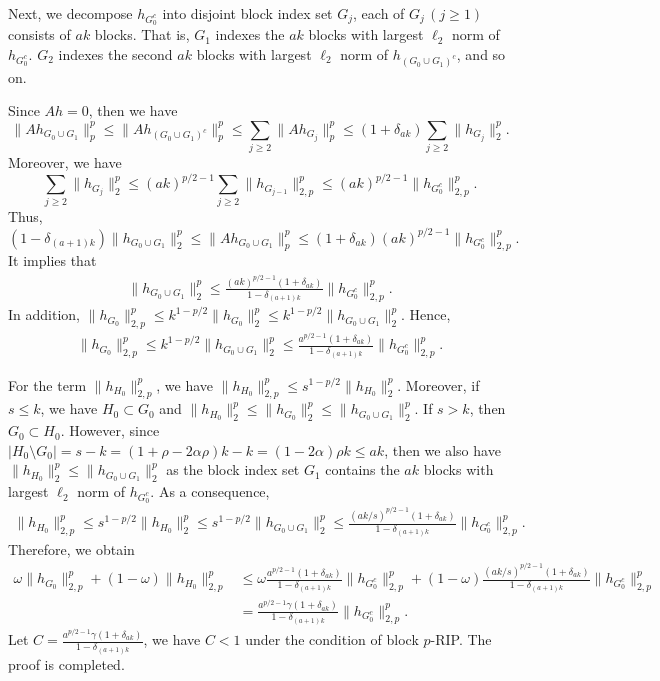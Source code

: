 \documentclass[11pt]{article}
\begin{document}
Next, we decompose $h_{G_0^c}$ into disjoint block index set $G_j$, each of $G_{j}\,(j\geq 1)$ consists of $ak$ blocks. That is, $G_1$ indexes the $ak$ blocks with largest $\ell_2$ norm of $h_{G_0^c}$. $G_2$ indexes the second $ak$ blocks with largest $\ell_2$ norm of $h_{(G_0\cup G_1)^c}$, and so on.

Since $Ah=0$, then we have $$
\lVert A h_{G_0\cup G_1}\rVert_p^p\leq \lVert A h_{(G_0\cup G_1)^c}\rVert_p^p\leq \sum\limits_{j\geq 2}\lVert Ah_{G_j}\rVert_p^p\leq (1+\delta_{ak})\sum\limits_{j\geq 2}\lVert h_{G_j}\rVert_{2}^p.
$$
Moreover, we have $$
\sum\limits_{j\geq 2}\lVert h_{G_j}\rVert_{2}^p\leq (ak)^{p/2-1}\sum\limits_{j\geq 2}\lVert h_{G_{j-1}}\rVert_{2,p}^p\leq (ak)^{p/2-1}\lVert h_{G_0^c}\rVert_{2,p}^p.
$$
Thus, $$
(1-\delta_{(a+1)k})\lVert h_{G_0\cup G_1}\rVert_2^p\leq \lVert A h_{G_0\cup G_1}\rVert_p^p\leq (1+\delta_{ak})(ak)^{p/2-1}\lVert h_{G_0^c}\rVert_{2,p}^p.
$$
It implies that \begin{align}
\lVert h_{G_0\cup G_1}\rVert_2^p\leq \frac{(ak)^{p/2-1}(1+\delta_{ak})}{1-\delta_{(a+1)k}}\lVert h_{G_0^c}\rVert_{2,p}^p.
\end{align}
In addition, $\lVert h_{G_0}\rVert_{2,p}^p\leq k^{1-p/2}\lVert h_{G_0}\rVert_{2}^p\leq k^{1-p/2}\lVert h_{G_0\cup G_1}\rVert_{2}^p$. Hence, \begin{align}
\lVert h_{G_0}\rVert_{2,p}^p\leq k^{1-p/2}\lVert h_{G_0\cup G_1}\rVert_{2}^p\leq \frac{a^{p/2-1}(1+\delta_{ak})}{1-\delta_{(a+1)k}}\lVert h_{G_0^c}\rVert_{2,p}^p. \label{G0}
\end{align}

For the term $\lVert h_{H_0}\rVert_{2,p}^p$, we have $\lVert h_{H_0}\rVert_{2,p}^p\leq s^{1-p/2}\lVert h_{H_0}\rVert_{2}^p$. Moreover, if $s\leq k$, we have $H_0\subset G_0$ and $\lVert h_{H_0}\rVert_{2}^p\leq \lVert h_{G_0}\rVert_{2}^p\leq \lVert h_{G_0\cup G_1}\rVert_{2}^p $. If $s>k$, then $G_0\subset H_0$. However, since $|H_0\setminus G_0|=s-k=(1+\rho-2\alpha\rho)k-k=(1-2\alpha)\rho k\leq ak$, then we also have  $\lVert h_{H_0}\rVert_{2}^p\leq \lVert h_{G_0\cup G_1}\rVert_{2}^p$ as the block index set $G_1$ contains the $ak$ blocks with largest $\ell_2$ norm of $h_{G_0^c}$. As a consequence, \begin{align}
\lVert h_{H_0}\rVert_{2,p}^p\leq s^{1-p/2}\lVert h_{H_0}\rVert_{2}^p\leq s^{1-p/2}\lVert h_{G_0\cup G_1}\rVert_{2}^p\leq \frac{(ak/s)^{p/2-1}(1+\delta_{ak})}{1-\delta_{(a+1)k}}\lVert h_{G_0^c}\rVert_{2,p}^p.
\end{align}
Therefore, we obtain \begin{align*}
\omega\lVert h_{G_0}\rVert_{2,p}^p+(1-\omega)\lVert h_{H_0}\rVert_{2,p}^p&\leq \omega\frac{a^{p/2-1}(1+\delta_{ak})}{1-\delta_{(a+1)k}}\lVert h_{G_0^c}\rVert_{2,p}^p+(1-\omega)\frac{(ak/s)^{p/2-1}(1+\delta_{ak})}{1-\delta_{(a+1)k}}\lVert h_{G_0^c}\rVert_{2,p}^p \\
&=\frac{a^{p/2-1}\gamma(1+\delta_{ak})}{1-\delta_{(a+1)k}}\lVert h_{G_0^c}\rVert_{2,p}^p.
\end{align*}
Let $C=\frac{a^{p/2-1}\gamma(1+\delta_{ak})}{1-\delta_{(a+1)k}}$, we have $C<1$ under the condition of block $p$-RIP. The proof is completed.
\end{document}
